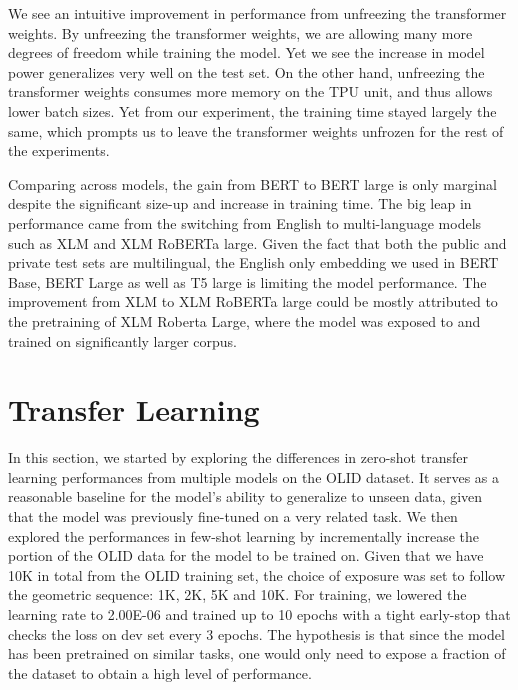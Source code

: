 \documentclass[11pt,a4paper]{article}
\begin{document}
We see an intuitive improvement in performance from unfreezing the transformer weights. By unfreezing the transformer weights, we are allowing many more degrees of freedom while training the model. Yet we see the increase in model power generalizes very well on the test set. On the other hand, unfreezing the transformer weights consumes more memory on the TPU unit, and thus allows lower batch sizes. Yet from our experiment, the training time stayed largely the same, which prompts us to leave the transformer weights unfrozen for the rest of the experiments. 

Comparing across models, the gain from BERT to BERT large is only marginal despite the significant size-up and increase in training time. The big leap in performance came from the switching from English to multi-language models such as XLM and XLM RoBERTa large. Given the fact that both the public and private test sets are multilingual, the English only embedding we used in BERT Base, BERT Large as well as T5 large is limiting the model performance. The improvement from XLM to XLM RoBERTa large could be mostly attributed to the pretraining of XLM Roberta Large, where the model was exposed to and trained on significantly larger corpus. 

\section{Transfer Learning}

In this section, we started by exploring the differences in zero-shot transfer learning performances from multiple models on the OLID dataset. It serves as a reasonable baseline for the model’s ability to generalize to unseen data, given that the model was previously fine-tuned on a very related task. We then explored the performances in few-shot learning by incrementally increase the portion of the OLID data for the model to be trained on. Given that we have 10K in total from the OLID training set, the choice of exposure was set to follow the geometric sequence: 1K, 2K, 5K and 10K. For training, we lowered the learning rate to 2.00E-06 and trained up to 10 epochs with a tight early-stop that checks the loss on dev set every 3 epochs. The hypothesis is that since the model has been pretrained on similar tasks, one would only need to expose a fraction of the dataset to obtain a high level of performance.
\end{document}
